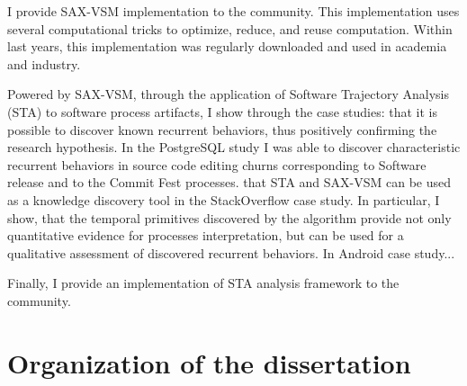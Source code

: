 I provide SAX-VSM implementation to the community. This implementation uses several computational tricks to optimize,
reduce, and reuse computation. Within last years, this implementation was regularly downloaded and used in academia and
industry. 

Powered by SAX-VSM, through the application of Software Trajectory Analysis (STA) to software process artifacts, I show
through the case studies: that it is possible to discover known recurrent behaviors, thus positively confirming the
research hypothesis. In the PostgreSQL study I was able to discover characteristic recurrent behaviors in source code
editing churns corresponding
to Software release and to the Commit Fest processes.
that STA and SAX-VSM can be used as a knowledge discovery tool in the StackOverflow case study. In particular, I show,
that the temporal primitives discovered by the algorithm provide not only quantitative evidence for processes
interpretation, but can be used for a qualitative assessment of discovered recurrent behaviors.
In Android case study...

Finally, I provide an implementation of STA analysis framework to the community. 

\section{Organization of the dissertation}